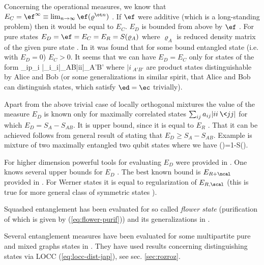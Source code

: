 \documentclass[twocolumn,aps,rmp]{revtex4}
\begin{document}
Concerning the operational measures, we know that
$E_C=\ef^\infty\equiv \lim_{n\to\infty} \ef(\varrho^{\ot n})$
\cite{cost}. If $\ef$ were additive (which is a long-standing
problem) then it would be equal to $E_C$. $E_D$ is bounded from
above by $\ef$ \cite{BDSW1996}. For pure states
$E_D=\ef=E_C=E_R=S(\varrho_A)$ where $\varrho_A$ is reduced density
matrix of the given pure state \cite{BBPS1996,PlenioVedral1998}. In
\cite{VidalC-irre} it was found that for some bound entangled
state (i.e. with $E_D=0$) $E_C>0$. It seems that we can have
$E_D=E_C$ only for states of the form
\be
\sum_ip_i
|\psi_i\>\<\psi_i|_{AB}\ot |i\>\<i|_{A'B'}
\ee
where $|i\>_{A'B'}$
are product states distinguishable by Alice and Bob \cite{termo} (or
some generalizations in  similar spirit, that Alice and Bob can
distinguish states, which satisfy  $\ed=\ec$ trivially).

Apart from the above trivial case of locally orthogonal mixtures
the value of the measure $E_D$ is known only for
maximally correlated states $\sum_{ij} a_{ij} |ii\>\<jj|$ for which
$E_D =S_A - S_{AB}$. It is upper bound, since it is equal to $E_R$
\cite{Rains1999}. That it can be achieved follows from general
result of \cite{DevetakWinter-hash} stating that $E_D\geq
S_A-S_{AB}$. Example is  mixture of two maximally entangled two
qubit states where we have
\be
\ed(\varrho)=1-S(\varrho).
\ee




For higher dimension  powerful tools for evaluating $E_D$ were provided
in \cite{Rains2001}. One knows several upper bounds for $E_D$
\cite{BDSW1996,PlenioVedral1998,Rains1999,irrev,Vidal-Werner,Rains2001}.
The best known bound is $E_{R+\ncal}$ provided in \cite{Rains2001}. For Werner
states it is equal  to regularization of $E_{R,\scal}$
(this is true for more general class of symmetric states  \cite{AudenaertMVW2002-asym-oo}).

Squashed entanglement has been evaluated for so called {\it flower state}
(purification of which is given by (\ref{eq:flower-purif}))
and its generalizations in \cite{ChristandlW-lock}.

Several entanglement measures have been evaluated for some multipartite
pure and mixed graphs states in \cite{MarkhamMV2007-em-graph}.
They have used results concerning distinguishing states via LOCC (\ref{eq:locc-dist-jap}), see sec. \ref{sec:rozroz}.
\end{document}
